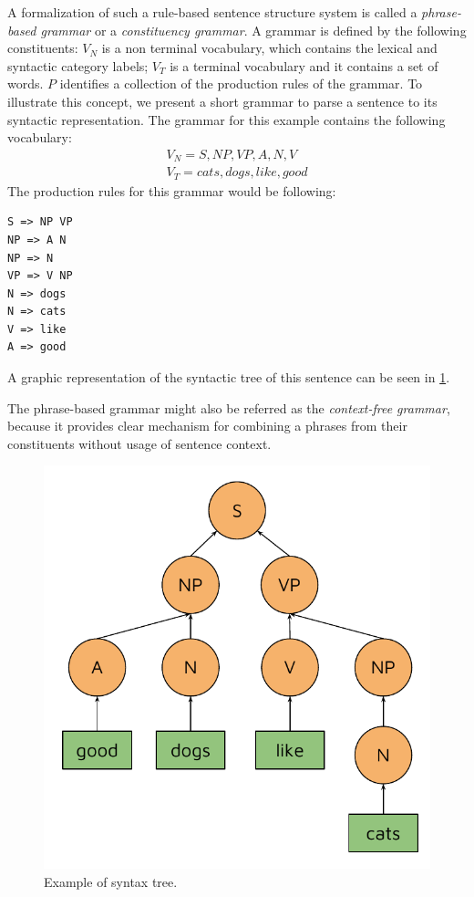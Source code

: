 A formalization of such a rule-based sentence structure system is called a \emph{phrase-based grammar} or a \emph{constituency grammar}. A grammar is defined by the following constituents:
$V_N$ is a non terminal vocabulary, which contains the lexical and syntactic category labels;
$V_T$ is a terminal vocabulary and it contains a set of words.
$P$ identifies a collection of the production rules of the grammar.
To illustrate this concept, we present a short grammar to parse a sentence  to its syntactic representation. The grammar for this example contains the following vocabulary:
\begin{equation}
\begin{split}
V_N = {S, NP, VP, A, N, V}\\
V_T = {cats, dogs, like, good}
\end{split}
\end{equation}
The production rules for this grammar would be following:
\begin{verbatim}
S => NP VP
NP => A N
NP => N
VP => V NP
N => dogs
N => cats
V => like
A => good
\end{verbatim}
A graphic representation of the syntactic tree of this sentence can be seen in \cref{fig:syntax_tree}.

The phrase-based grammar might also be referred as the \emph{context-free grammar}, because it provides clear mechanism for combining a phrases from their constituents without usage of sentence context.

\begin{figure}
\centering
\includegraphics{Figures/syntaxtree}
\decoRule
\caption[Syntax tree]{Example of syntax tree.}
\label{fig:syntax_tree}
\end{figure}


